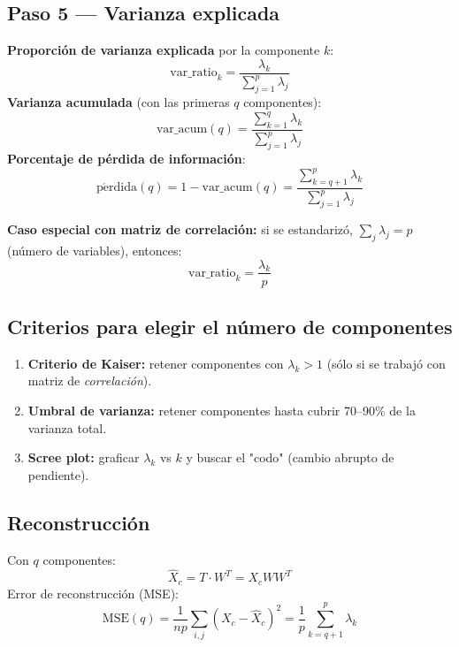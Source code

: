 \documentclass[11pt,a4paper]{article}
\begin{document}
\subsection{Paso 5 — Varianza explicada}

\begin{formulabox}
\textbf{Proporción de varianza explicada} por la componente $k$:
\[
\boxed{\;\mathrm{var\_ratio}_k = \frac{\lambda_k}{\sum_{j=1}^{p}\lambda_j}\;}
\]
\textbf{Varianza acumulada} (con las primeras $q$ componentes):
\[
\mathrm{var\_acum}(q) = \frac{\sum_{k=1}^{q}\lambda_k}{\sum_{j=1}^{p}\lambda_j}
\]
\textbf{Porcentaje de pérdida de información}:
\[
\boxed{\;\mathrm{p\acute{e}rdida}(q) = 1 - \mathrm{var\_acum}(q) = \frac{\sum_{k=q+1}^{p}\lambda_k}{\sum_{j=1}^{p}\lambda_j}\;}
\]

\textbf{Caso especial con matriz de correlación:} si se estandarizó, $\sum_j \lambda_j = p$ (número de variables), entonces:
\[
\mathrm{var\_ratio}_k = \frac{\lambda_k}{p}
\]
\end{formulabox}

\subsection{Criterios para elegir el número de componentes}

\begin{formulabox}
\begin{enumerate}[leftmargin=*]
    \item \textbf{Criterio de Kaiser:} retener componentes con $\lambda_k > 1$ (sólo si se trabajó con matriz de \emph{correlación}).
    \item \textbf{Umbral de varianza:} retener componentes hasta cubrir 70--90\% de la varianza total.
    \item \textbf{Scree plot:} graficar $\lambda_k$ vs $k$ y buscar el "codo" (cambio abrupto de pendiente).
\end{enumerate}
\end{formulabox}

\subsection{Reconstrucción}

\begin{formulabox}
Con $q$ componentes:
\[
\widehat{X}_c = T \cdot W^{T} = X_c W W^{T}
\]
Error de reconstrucción (MSE):
\[
\mathrm{MSE}(q) = \frac{1}{np}\sum_{i,j}(X_c - \widehat{X}_c)^2 = \frac{1}{p}\sum_{k=q+1}^{p}\lambda_k
\]
\end{formulabox}
\end{document}
